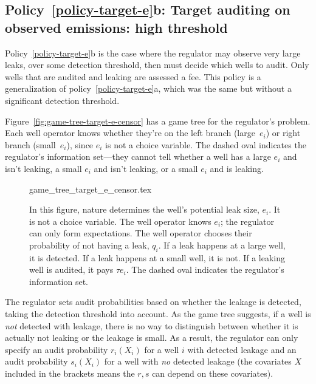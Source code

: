 \documentclass[12pt,oneside,letterpaper]{article}
\theoremstyle{definition}
\begin{document}
\begin{refsection}
\subsection{Policy~\ref{policy-target-e}b: Target auditing on observed emissions: high threshold}
\label{app:audit-target-e-high-threshold}

Policy~\ref{policy-target-e}b is the case where the regulator may observe very large leaks, over some detection threshold, then must decide which wells to audit.
Only wells that are audited and leaking are assessed a fee.
This policy is a generalization of policy~\ref{policy-target-e}a, which was the same but without a significant detection threshold.

Figure~\ref{fig:game-tree-target-e-censor} has a game tree for the regulator's problem.
Each well operator knows whether they're on the left branch (large~\(e_i\)) or right branch (small~\(e_i\)), since \(e_i\) is not a choice variable.
The dashed oval indicates the regulator's information set---they cannot tell whether a well has a large \(e_i\) and isn't leaking, a small \(e_i\) and isn't leaking, or a small \(e_i\) and is leaking.

\begin{figure}[!hbt]
{game_tree_target_e_censor.tex}


\begin{minipage}{0.95\textwidth}

\begin{justify}
{\small
In this figure, nature determines the well's potential leak size, \(e_i\).
It is not a choice variable.
The well operator knows \(e_i\); the regulator can only form expectations.
The well operator chooses their probability of not having a leak, \(q_i\).
If a leak happens at a large well, it is detected. If a leak happens at a small well, it is not.
If a leaking well is audited, it pays \(\tau e_i\).
The dashed oval indicates the regulator's information set.
}
\end{justify}
\end{minipage}
\end{figure}



The regulator sets audit probabilities based on whether the leakage is detected, taking
the detection threshold into account.
As the game tree suggests, if a well is \textit{not} detected with leakage, there is no way to distinguish between whether it is actually not leaking or the leakage is small.
As a result, the regulator can only specify an audit probability $r_i(X_i)$ for a well $i$ with detected leakage and an audit probability $s_i(X_i)$ for a well with \textit{no} detected leakage (the covariates $X$ included in the brackets means the $r,s$ can depend on these covariates).


\end{refsection}
\end{document}
